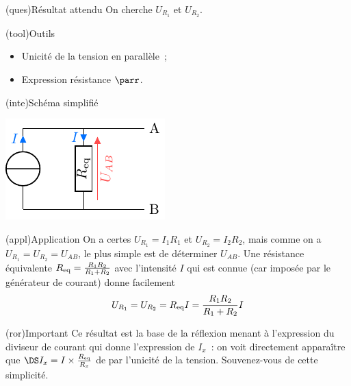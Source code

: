 \documentclass[../../main/main.tex]{subfiles}
\begin{document}
{\begin{tcbraster}[raster columns=3, raster equal height=rows]
\begin{tcb}
\begin{center}
        \end{center}
    \end{tcb}
    \begin{tcolorbox}[blankest, raster multicolumn=1, space to=\myspace]
        \begin{tcbraster}[raster columns=1]
            \begin{tcb}(ques){Résultat attendu}
                On cherche $U_{R_1}$ et $U_{R_2}$.
            \end{tcb}
            \begin{tcb}[add to natural height=\myspace](tool){Outils}
                \begin{itemize}
                    \item Unicité de la tension en parallèle~;
                    \item Expression résistance $\parr$.
                \end{itemize}
            \end{tcb}
        \end{tcbraster}
    \end{tcolorbox}
    \begin{tcb}(inte){Schéma simplifié}
        \begin{center}
            \includegraphics{divcour-simple}
        \end{center}
    \end{tcb}
\end{tcbraster}
\begin{tcbraster}[raster columns=2, raster equal height=rows]
    \begin{tcb}(appl){Application}
        On a certes $U_{R_1} = I_1R_1$ et $U_{R_2} = I_2R_2$, mais comme on a
        $U_{R_1} = U_{R_2} = U_{AB}$, le plus simple est de déterminer $U_{AB}$.
        Une résistance équivalente $R_{\rm eq} = \frac{R_1R_2}{R_1+R_2}$ avec
        l'intensité $I$ qui est connue (car imposée par le générateur de
        courant) donne facilement \[U_{R_1} = U_{R_2} = R_{\rm eq}I =
        \frac{R_1R_2}{R_1+R_2}I\]
    \end{tcb}
    \begin{tcb}(ror){Important}
        Ce résultat est la base de la réflexion menant à l'expression du
        diviseur de courant qui donne l'expression de $I_x$~: on voit
        directement apparaître que $\DS I_x = I\times\frac{R_{\rm eq}}{R_x}$ de par
        l'unicité de la tension. Souvenez-vous de cette simplicité.
    \end{tcb}
\end{tcbraster}

}
\end{document}
